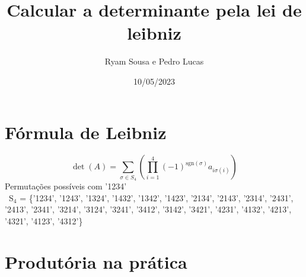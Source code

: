 \documentclass{article}
\title{Calcular a determinante pela lei de leibniz}
\author{Ryam Sousa e Pedro Lucas}
\date{10/05/2023}
\begin{document}
    \maketitle
    \section{Fórmula de Leibniz}
    
    
    \[
    \det(A) = \sum_{\sigma \in S_4} \left( \prod_{i=1}^{4} (-1)^{\mathrm{sgn}(\sigma)} a_{i\sigma(i)} \right)
    \] \newline
    Permutações possíveis com '1234'\newline\\
    \ {S}$_4$ = \{'1234', '1243', '1324', '1432', '1342', '1423', 
    '2134', '2143', '2314', '2431', '2413', '2341', 
    '3214', '3124', '3241', '3412', '3142', '3421', 
    '4231', '4132', '4213', '4321', '4123', '4312'\} \newline
    
    \section{Produtória na prática}
    
\end{document}
